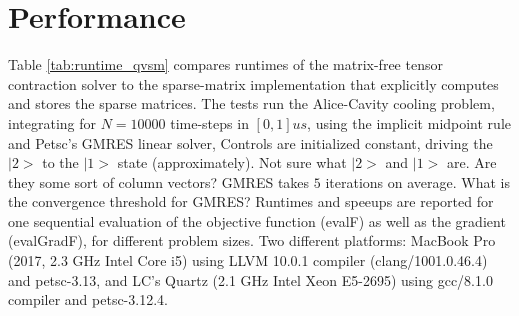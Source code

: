 \documentclass[letterpaper]{article}
\newcommand{\YC}[1]{{\textcolor{Bronze}{#1}}}
\begin{document}
\section{Performance}
Table \ref{tab:runtime_qvsm} compares runtimes of the matrix-free tensor
contraction solver to the sparse-matrix implementation that explicitly computes
and stores the sparse matrices. The tests run the Alice-Cavity cooling problem,
integrating for $N=10000$ time-steps in $[0,1]us$, using the implicit midpoint
rule and Petsc's GMRES linear solver, Controls are initialized constant, driving
the $|2>$ to the $|1>$ state (approximately). \YC{Not sure what $|2>$ and $|1>$
are. Are they some sort of column vectors?} GMRES takes $5$ iterations on
average. \YC{What is the convergence threshold for GMRES?} Runtimes and speeups
are reported for one sequential evaluation of the objective function (evalF) as
well as the gradient (evalGradF), for different problem sizes. Two different
platforms: MacBook Pro (2017, 2.3 GHz Intel Core i5) using LLVM 10.0.1 compiler
(clang/1001.0.46.4) and petsc-3.13, and LC's Quartz (2.1 GHz Intel Xeon E5-2695)
using gcc/8.1.0 compiler and petsc-3.12.4.
\end{document}
